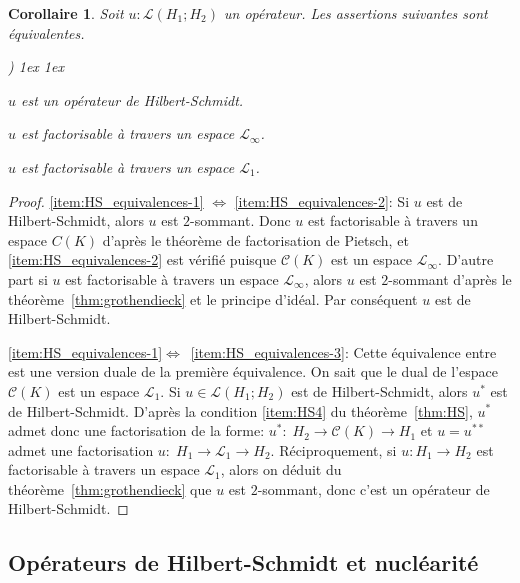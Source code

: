 \documentclass{smfart}
\theoremstyle{plain}
\newtheorem{corollary}[theorem]{Corollaire}
\theoremstyle{definition}
\newcommand {\ELL} {{\mathcal L}}
\newcommand {\BOUNDED} {{\mathcal L}}
\newcounter{aufzi}
\newenvironment{aufzi}{\begin{list}{ {\upshape\alph{aufzi})}}{
        \usecounter{aufzi}
        \topsep1ex
        \parsep0cm
        \itemsep1ex
        \leftmargin0.8cm
        \labelwidth0.5cm
        \labelsep0.3cm
}}
{\end{list}}
\begin{document}
\begin{corollary}\label{cor:HS_equivalences}
Soit $u: \BOUNDED(H_1; H_2)$ un opérateur. Les assertions suivantes sont équivalentes.
\begin{aufzi}
 \item\label{item:HS_equivalences-1} $u$ est un opérateur de Hilbert-Schmidt.
 \item\label{item:HS_equivalences-2}  $u$ est factorisable à   travers un espace $\mathcal{L}_\infty$.
 \item\label{item:HS_equivalences-3} $u$ est factorisable à   travers un espace $\mathcal{L}_1$.
 \end{aufzi}
\end{corollary}
\begin{proof}
  \ref{item:HS_equivalences-1} $\Leftrightarrow$
  \ref{item:HS_equivalences-2}: Si $u$ est de Hilbert-Schmidt, alors
  $u$ est $2$-sommant. Donc $u$ est factorisable à travers un espace
  $C\left(K\right)$ d'après le théorème de factorisation de Pietsch,
  et \ref{item:HS_equivalences-2} est vérifié puisque ${\mathcal
    C}(K)$ est un espace $\ELL_{\infty}$. D'autre part si $u$ est
  factorisable à travers un espace $\mathcal{L}_\infty$, alors $u$ est
  $2$-sommant d'après le théorème~\ref{thm:grothendieck} et le
  principe d'idéal. Par conséquent $u$ est de Hilbert-Schmidt.

  \ref{item:HS_equivalences-1}$\Leftrightarrow$~\ref{item:HS_equivalences-3}:
  Cette équivalence entre est une version duale de la première
  équivalence. On sait que le dual de l'espace ${\mathcal C}\left(K\right)$ est
  un espace $\mathcal{L}_1$. Si $u \in {\mathcal L}(H_1; H_2)$ est de
  Hilbert-Schmidt, alors $u^*$ est de Hilbert-Schmidt. D'après la
  condition \ref{item:HS4} du théorème~\ref{thm:HS}, $u^*$ admet donc
  une factorisation de la forme: 
$u^*:\; H_2 \longrightarrow   {\mathcal C}\left(K\right) \longrightarrow H_1$ et $u=u^{**}$ admet une
  factorisation 
$u:\;  H_1\longrightarrow\mathcal{L}_1\longrightarrow H_2$.
  Réciproquement, si $u:H_1\rightarrow H_2$ est factorisable à travers
  un espace $\mathcal{L}_1$, alors on déduit du
  théorème~\ref{thm:grothendieck} que $u$ est $2$-sommant, donc c'est
  un opérateur de Hilbert-Schmidt.
\end{proof}




\subsection{Opérateurs de Hilbert-Schmidt et nucléarité}
\end{document}
